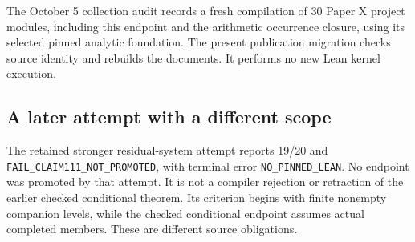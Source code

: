The October 5 collection audit records a fresh compilation of 30 Paper X project modules, including this endpoint and the arithmetic occurrence closure, using its selected pinned analytic foundation. The present publication migration checks source identity and rebuilds the documents. It performs no new Lean kernel execution.

\subsection{A later attempt with a different scope}
The retained stronger residual-system attempt reports 19/20 and
\nolinkurl{FAIL_CLAIM111_NOT_PROMOTED}, with terminal error
\nolinkurl{NO_PINNED_LEAN}. No endpoint was promoted by that attempt. It is not a compiler rejection or retraction of the earlier checked conditional theorem. Its criterion begins with finite nonempty companion levels, while the checked conditional endpoint assumes actual completed members. These are different source obligations.

